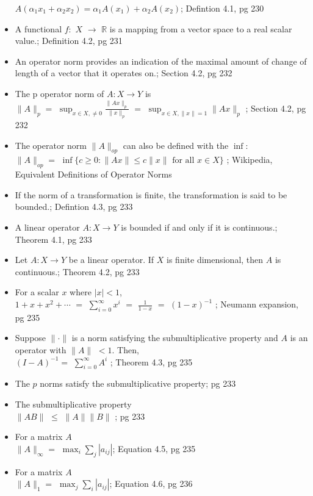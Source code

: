 \documentclass{article}
\begin{document}
\begin{multicols}{2}
\begin{itemize}
$ A( \alpha_1 x_1 + \alpha_2 x_2) = \alpha_1 A (x_1) + \alpha_2 A (x_2) $; Defintion 4.1, pg 230
\item A functional $f\colon $ $X$ $\to$ $ \mathbb{R} $ is a mapping from a vector space to a real scalar value.; Definition 4.2, pg 231
\item An operator norm provides an indication of the maximal amount of change of length of a vector that it operates on.; Section 4.2, pg 232
\item The p operator norm of $A:X \to Y$ is \\
$\|A\|_p = $ $ \sup_{x \in X, \neq 0} \frac{\|Ax\|_p} {\|x\|_p} $ $=$ $ \sup_{x \in X, \|x\| = 1} \|Ax\|_p $ ; Section 4.2, pg 232
\item The operator norm $\|A\|_{op}$ can also be defined with the $\inf$: \\
$\|A\|_{op} =$ $ \inf \{ c \geq 0 : \|Ax\| \leq c\|x\| \text{ for all } x \in X \} $ ; Wikipedia, Equivalent Definitions of Operator Norms
\item If the norm of a transformation is finite, the transformation is said to be bounded.; Defintion 4.3, pg 233
\item A linear operator $A: X \to Y$ is bounded if and only if it is continuous.; Theorem 4.1, pg 233
\item Let $A: X \to Y$ be a linear operator. If $X$ is finite dimensional, then $A$ is continuous.; Theorem 4.2, pg 233
\item For a scalar $x$ where $|x| < 1$, \\
$1 + x + x^2 + \cdots$ $=$ $ \sum_{i=0}^{\infty} x^i $ $=$ $ \frac{1}{1 - x} $ $=$ $ (1-x)^{-1} $ ; Neumann expansion, pg 235
\item Suppose $\|\cdot\|$ is a norm satisfying the submultiplicative property and $A$ is an operator with $\|A\|$ $< 1$. Then, \\
$ (I - A)^{-1} = $ $ \sum_{i=0}^{\infty} A^i $ ; Theorem 4.3, pg 235
\item The $p$ norms satisfy the submultiplicative property; pg 233
\item The submultiplicative property\\
$ \|AB\| $ $ \leq $  $ \|A\| \|B\| $ ; pg 233
\item For a matrix $A$ \\
$\|A\|_{\infty} = $ $ \max_i \sum_j |a_{ij}| $; Equation 4.5, pg 235
\item For a matrix $A$ \\
$\|A\|_{1} = $ $ \max_j \sum_i |a_{ij}| $; Equation 4.6, pg 236

\end{itemize}
\end{multicols}
\end{document}
